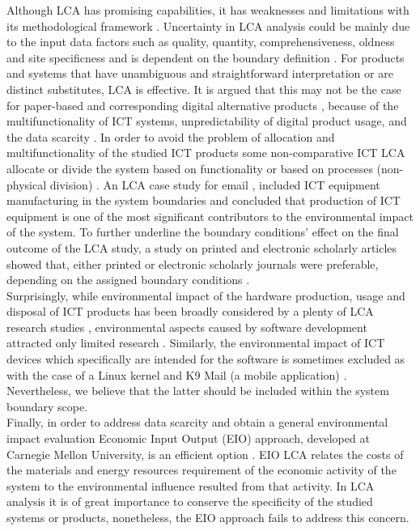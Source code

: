 \documentclass[3p,times,procedia]{elsarticle}
\begin{document}
Although LCA has promising capabilities, it has weaknesses and limitations with its methodological framework \cite{joshi1999product, reap2008survey, hermann2007assessing}. Uncertainty in LCA analysis could be mainly due to the input data factors such as quality, quantity, comprehensiveness, oldness  and site specificness \cite{curran2005international, reap2008survey} and is dependent on the boundary definition \cite{joshi1999product}. For products and systems that have unambiguous and straightforward interpretation or are distinct substitutes,  LCA  is effective. It is argued that this may not be the case for paper-based and  corresponding  digital  alternative products \cite{Bull201410, reap2008survey}, because of the multifunctionality of ICT systems, unpredictability of digital product usage, and the  data  scarcity \cite{Bull201410, farrant2012environmental, enroth2009}. In order to avoid the problem of allocation and multifunctionality of the studied ICT products some non-comparative ICT LCA allocate or divide the system based on functionality or based on processes (non-physical division) \cite{choi2006life,frey2006ecological}. An LCA case study for email \cite{farrant2012environmental}, included ICT equipment manufacturing in the system boundaries and concluded that production of ICT equipment is one of the most significant contributors to the environmental impact of the system. To further underline the boundary conditions' effect on the final outcome of the LCA study, a study on printed and electronic scholarly articles showed that, either printed or electronic scholarly journals were preferable, depending on the assigned boundary conditions \cite{gard2002digital}.\\

Surprisingly, while environmental impact of the hardware production, usage and disposal of ICT products has been broadly considered by a plenty of LCA research studies \cite{Bull201410, farrant2012environmental, enroth2009}, environmental aspects caused by software development attracted only limited research \cite{Moshnyaga:2013}. Similarly, the environmental impact of ICT devices which specifically are intended for the software is sometimes excluded as with the case of a Linux kernel and K9 Mail (a mobile application) \cite{moshnyaga2013assessment,Moshnyaga:2013}. Nevertheless, we believe that the latter should be included within the system boundary scope.\\

Finally, in order to address data scarcity and obtain a general environmental impact evaluation Economic Input Output (EIO) approach, developed at Carnegie Mellon University, is an efficient option \cite{junnila2008life, matthews2000extending}. EIO LCA relates the costs of the materials and energy resources requirement of the economic activity of the system to the environmental influence resulted from that activity. In LCA analysis it is of great importance to conserve the specificity of the studied systems or products, nonetheless, the EIO approach fails to address this concern. 
\end{document}
